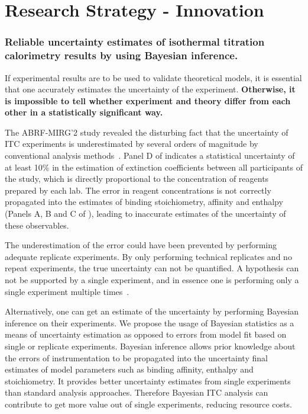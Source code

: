 \documentclass[10pt,final]{article}
\newif\ifinstr
\newcommand{\instr}[1]{\ifdraft{\ifinstr {\color{cyan}\emph{#1}} \fi}{}}
\begin{document}
\section*{Research Strategy - Innovation}
\instr{Explain how your proposal differs from what others have tried.}
\subsubsection*{Reliable uncertainty estimates of isothermal titration calorimetry results by using Bayesian inference.}
If experimental results are to be used to validate theoretical models, it is essential that one accurately estimates the uncertainty of the experiment. 
%
\textbf{Otherwise, it is impossible to tell whether experiment and theory differ from each other in a statistically significant way.}

The ABRF-MIRG'2 study revealed the disturbing fact that the uncertainty of ITC experiments is underestimated by several orders of magnitude by conventional analysis methods~\autocite{Myszka2003a}.
%
Panel D of  indicates a statistical uncertainty of at least 10\% in the estimation of extinction coefficients between all participants of the study, which is directly proportional to the concentration of reagents prepared by each lab. 
%
The error in reagent concentrations is not correctly propagated into the estimates of binding stoichiometry, affinity and enthalpy  (Panels A, B and C of ), leading to inaccurate estimates of the uncertainty of these observables.

The underestimation of the error could have been prevented by performing adequate replicate experiments.
%
By only performing technical replicates and no repeat experiments, the true uncertainty can not be quantified.
%
A hypothesis can not be supported by a single experiment, and in essence one is performing only a single experiment multiple times~\autocite{Vaux2012a}.

Alternatively, one can get an estimate of the uncertainty by performing Bayesian inference on their experiments.
%
We propose the usage of Bayesian statistics as a means of uncertainty estimation as opposed to errors from model fit based on single or replicate experiments.
%
Bayesian inference allows prior knowledge about the errors of instrumentation to be propagated into the uncertainty final estimates of model parameters such as binding affinity, enthalpy and stoichiometry. 
%
It provides better uncertainty estimates from single experiments than standard analysis approaches.
%
Therefore Bayesian ITC analysis can contribute to get more value out of single experiments, reducing resource costs. 
\end{document}
